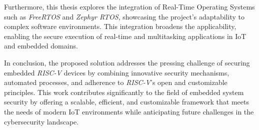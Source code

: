 Furthermore, this thesis explores the integration of Real-Time Operating Systems
such as \textit{FreeRTOS} and \textit{Zephyr RTOS}, showcasing the project's adaptability
to complex software environments. This integration broadens the applicability, enabling
the secure execution of real-time and multitasking applications in IoT and embedded
domains.

In conclusion, the proposed solution addresses the pressing challenge of
securing embedded \textit{RISC-V} devices by combining innovative security mechanisms,
automated processes, and adherence to \textit{RISC-V}'s open and customizable
principles. This work contributes significantly to the field of embedded system security
by offering a scalable, efficient, and customizable framework that meets the needs
of modern IoT environments while anticipating future challenges in the cybersecurity
landscape.